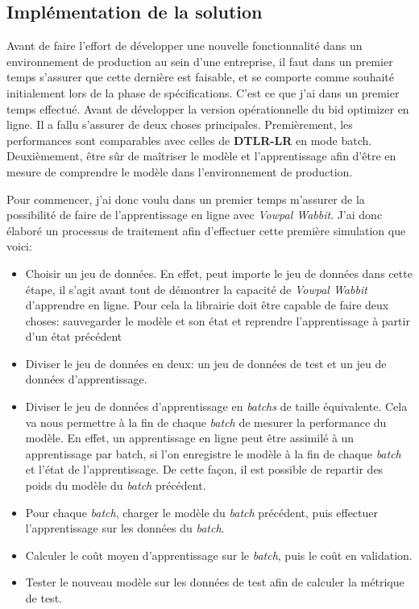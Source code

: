     \subsection{Implémentation de la solution}
        Avant de faire l'effort de développer une nouvelle fonctionnalité dans un environnement de production au sein d'une entreprise, il faut dans un premier temps s'assurer que cette dernière est faisable, et se comporte comme souhaité initialement lors de la phase de spécifications. C'est ce que j'ai dans un premier temps effectué. Avant de développer la version opérationnelle du bid optimizer en ligne. Il a fallu s'assurer de deux choses principales. Premièrement, les performances sont comparables avec celles de \textbf{DTLR-LR} en mode batch. Deuxièmement, être sûr de maîtriser le modèle et l'apprentissage afin d'être en mesure de comprendre le modèle dans l'environnement de production. \par
        Pour commencer, j'ai donc voulu dans un premier temps m'assurer de la possibilité de faire de l'apprentissage en ligne avec \emph{Vowpal Wabbit}. J'ai donc élaboré un processus de traitement afin d'effectuer cette première simulation que voici:
        \begin{itemize}
            \item Choisir un jeu de données. En effet, peut importe le jeu de données dans cette étape, il s'agit avant tout de démontrer la capacité de \emph{Vowpal Wabbit} d'apprendre en ligne. Pour cela la librairie doit être capable de faire deux choses:  sauvegarder le modèle et son état et reprendre l'apprentissage à partir d'un état précédent
            \item Diviser le jeu de données en deux: un jeu de données de test et un jeu de données d'apprentissage. 
            \item Diviser le jeu de données d'apprentissage en \emph{batchs} de taille équivalente. Cela va nous permettre à la fin de chaque \emph{batch} de mesurer la performance du modèle. En effet, un apprentissage en ligne peut être assimilé à un apprentissage par \emph{}batch, si l'on enregistre le modèle à la fin de chaque \emph{batch} et l'état de l'apprentissage. De cette façon, il est possible de repartir des poids du modèle du \emph{batch} précédent.
            \item Pour chaque \emph{batch}, charger le modèle du \emph{batch} précédent, puis effectuer l'apprentissage sur les données du \emph{batch}.
            \item Calculer le coût moyen d'apprentissage sur le \emph{batch}, puis le coût en validation. 
            \item Tester le nouveau modèle sur les données de test afin de calculer la métrique de test.
        \end{itemize}
